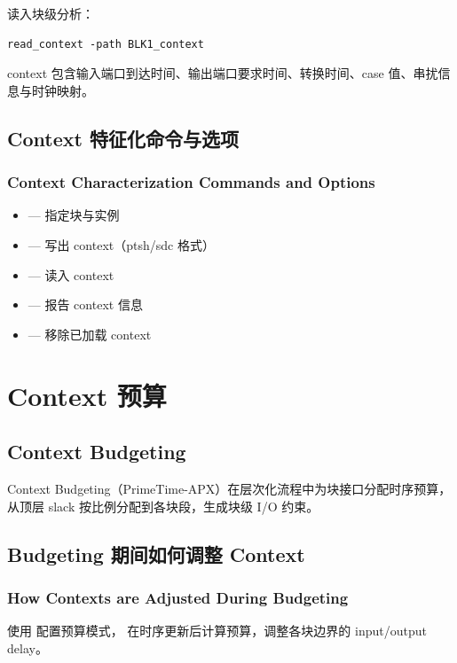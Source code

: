 读入块级分析：
\begin{lstlisting}
read_context -path BLK1_context
\end{lstlisting}

context 包含输入端口到达时间、输出端口要求时间、转换时间、case 值、串扰信息与时钟映射。

\subsection{Context 特征化命令与选项}
\subsubsection*{Context Characterization Commands and Options}

\begin{itemize}
  \item {} — 指定块与实例
  \item {} — 写出 context（ptsh/sdc 格式）
  \item {} — 读入 context
  \item {} — 报告 context 信息
  \item {} — 移除已加载 context
\end{itemize}

\section{Context 预算}
\subsection*{Context Budgeting}

Context Budgeting（PrimeTime-APX）在层次化流程中为块接口分配时序预算，从顶层 slack 按比例分配到各块段，生成块级 I/O 约束。


\subsection{Budgeting 期间如何调整 Context}
\subsubsection*{How Contexts are Adjusted During Budgeting}

使用  配置预算模式， 在时序更新后计算预算，调整各块边界的 input/output delay。

